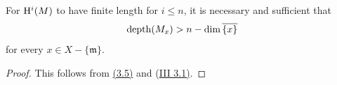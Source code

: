 \begin{sgacorollary}
For $\mathrm H^i(M)$ to have finite length for $i\leq n$, it is necessary and
sufficient that
\[
  \operatorname{depth}(M_x)>n-\dim\overline{\{x\}}
\]
for every $x\in X-\{\mathfrak m\}$.
\end{sgacorollary}

\begin{proof}
\renewcommand{\qedsymbol}{}
This follows from \textup{\hyperref[V.3.5]{(3.5)}} and \textup{(\hyperref[III.3.1]{III 3.1)}}.
\end{proof}
